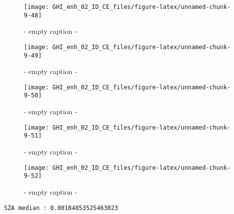 \documentclass[
  10pt,
  a4paper,oneside]{article}
\begin{document}
\begin{figure}[H]

{\centering \texttt{[image: GHI\_enh\_02\_ID\_CE\_files/figure-latex/unnamed-chunk-9-48]} 

}

\caption{ - empty caption - }\label{fig:unnamed-chunk-9-48}
\end{figure}
\begin{figure}[H]

{\centering \texttt{[image: GHI\_enh\_02\_ID\_CE\_files/figure-latex/unnamed-chunk-9-49]} 

}

\caption{ - empty caption - }\label{fig:unnamed-chunk-9-49}
\end{figure}
\begin{figure}[H]

{\centering \texttt{[image: GHI\_enh\_02\_ID\_CE\_files/figure-latex/unnamed-chunk-9-50]} 

}

\caption{ - empty caption - }\label{fig:unnamed-chunk-9-50}
\end{figure}
\begin{figure}[H]

{\centering \texttt{[image: GHI\_enh\_02\_ID\_CE\_files/figure-latex/unnamed-chunk-9-51]} 

}

\caption{ - empty caption - }\label{fig:unnamed-chunk-9-51}
\end{figure}
\begin{figure}[H]

{\centering \texttt{[image: GHI\_enh\_02\_ID\_CE\_files/figure-latex/unnamed-chunk-9-52]} 

}

\caption{ - empty caption - }\label{fig:unnamed-chunk-9-52}
\end{figure}

\begin{verbatim}
SZA median : 0.00184853525463023 
\end{verbatim}
\end{document}
